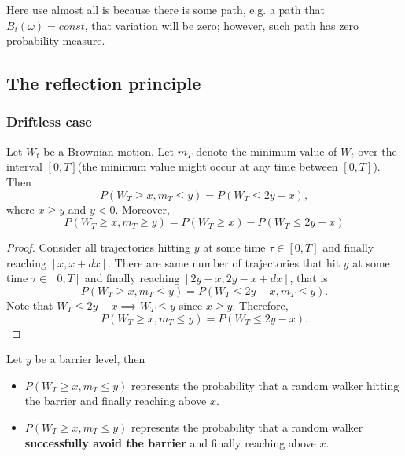\begin{refsection}
\begin{remark}
	Here use almost all is because there is some path, e.g. a path that $B_t(\omega) = const$, that variation will be zero; however, such path has zero probability measure. 
\end{remark}


\subsection{The reflection principle}
\subsubsection{Driftless case}
\begin{lemma}\label{ch:theory-of-stochastic-process:th:BrownianmotionReflectionPrinciple}\cite[208]{joshi2003concepts}
	Let $W_t$ be a Brownian motion. Let $m_T$ denote the minimum value of $W_t$ over the interval $[0,T]$(the minimum value might occur at any time between $[0,T]$). Then
	$$P(W_T \geq x, m_T \leq y) = P(W_T \leq 2y -  x),$$
	where $x\geq y$ and $y<0$.
	Moreover, 
	$$P(W_T \geq x, m_T\geq y) = P(W_T \geq x) - P(W_T\leq 2y - x)$$
\end{lemma}
\begin{proof}
	Consider all trajectories hitting $y$ at some time $\tau \in [0,T]$ and finally reaching $[x,x+dx]$. There are same number of trajectories that hit $y$ at some time $\tau \in [0,T]$ and finally reaching $[2y-x, 2y-x+dx]$, that is
	$$P(W_T \geq x, m_T \leq y) = P(W_T \leq 2y - x, m_T \leq y).$$
	Note that $W_T \leq 2y - x \implies W_T \leq y$ since $x\geq y$. Therefore, 
	$$P(W_T \geq x, m_T \leq y) = P(W_T \leq 2y - x).$$
\end{proof}

\begin{remark}[interpretation]
	Let $y$ be a barrier level, then 
	\begin{itemize}
		\item $P(W_T \geq x, m_T \leq y)$ represents the probability that a random walker hitting the barrier and finally reaching above $x$.
		\item  $P(W_T \geq x, m_T \leq y)$ represents the probability that a random walker \textbf{successfully avoid the barrier} and finally reaching above $x$.
	\end{itemize}
\end{remark}



\end{refsection}
